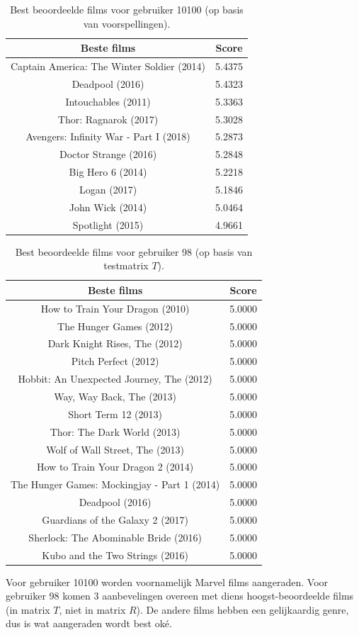 \begin{table}[H]
\centering
\begin{tabular}{c|c}
\textbf{Beste films} & \textbf{Score} \\
\hline
    Captain America: The Winter Soldier (2014) & 5.4375 \\
    Deadpool (2016)                            & 5.4323 \\
    Intouchables (2011)                        & 5.3363 \\
    Thor: Ragnarok (2017)                      & 5.3028 \\
    Avengers: Infinity War - Part I (2018)     & 5.2873 \\
    Doctor Strange (2016)                      & 5.2848 \\
    Big Hero 6 (2014)                          & 5.2218 \\
    Logan (2017)                               & 5.1846 \\
    John Wick (2014)                           & 5.0464 \\
    Spotlight (2015)                           & 4.9661 
\end{tabular}
\caption{Best beoordeelde films voor gebruiker 10100 (op basis van voorspellingen).}
\label{fig:op18b}
\end{table}

\begin{table}[H]
\centering
\begin{tabular}{c|c}
\textbf{Beste films} & \textbf{Score} \\
\hline
How to Train Your Dragon (2010)             & 5.0000 \\
The Hunger Games (2012)                     & 5.0000 \\
Dark Knight Rises, The (2012)               & 5.0000 \\
Pitch Perfect (2012)                        & 5.0000 \\
Hobbit: An Unexpected Journey, The (2012)   & 5.0000 \\
Way, Way Back, The (2013)                   & 5.0000 \\
Short Term 12 (2013)                        & 5.0000 \\
Thor: The Dark World (2013)                 & 5.0000 \\
Wolf of Wall Street, The (2013)             & 5.0000 \\
How to Train Your Dragon 2 (2014)           & 5.0000 \\
The Hunger Games: Mockingjay - Part 1 (2014)& 5.0000 \\
Deadpool (2016)                             & 5.0000 \\
Guardians of the Galaxy 2 (2017)            & 5.0000 \\
Sherlock: The Abominable Bride (2016)       & 5.0000 \\
Kubo and the Two Strings (2016)             & 5.0000
\end{tabular}
\caption{Best beoordeelde films voor gebruiker 98 (op basis van testmatrix $T$).}
\label{fig:op18c}
\end{table}

\noindent Voor gebruiker 10100 worden voornamelijk Marvel films aangeraden. Voor gebruiker 98 komen 3 aanbevelingen overeen met diens hoogst-beoordeelde films (in matrix $T$, niet in matrix $R$). De andere films hebben een gelijkaardig genre, dus is wat aangeraden wordt best ok\'e.\\


